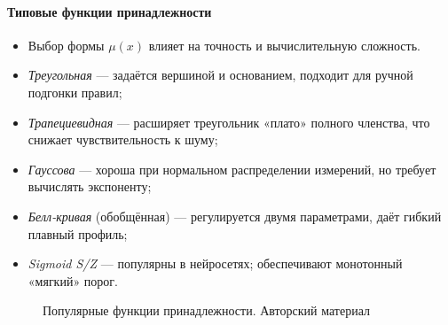\paragraph{Типовые функции принадлежности}
\begin{itemize}
  \item[] Выбор формы $\mu(x)$ влияет на точность и вычислительную сложность.
  \item \emph{Треугольная} —
        задаётся вершиной и основанием,
        подходит для ручной подгонки правил;
  \item \emph{Трапециевидная} —
        расширяет треугольник «плато» полного членства,
        что снижает чувствительность к шуму;
  \item \emph{Гауссова} —
        хороша при нормальном распределении измерений,
        но требует вычислять экспоненту;
  \item \emph{Белл-кривая} (обобщённая) —
        регулируется двумя параметрами,
        даёт гибкий плавный профиль;
  \item \emph{Sigmoid S/Z} —
        популярны в нейросетях;
        обеспечивают монотонный «мягкий» порог.
\end{itemize}

\begin{figure}[h]
\centering
{}
\caption{Популярные функции принадлежности. Авторский материал}
\label{fig:mpf}
\end{figure}

